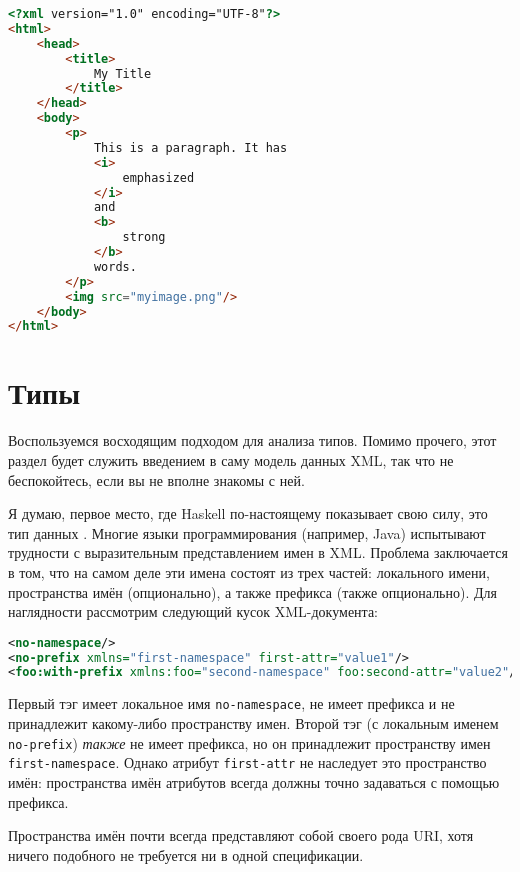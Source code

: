 

\begin{lstlisting}[language=HTML, caption={Выходные данные в формате XHTML}]
<?xml version="1.0" encoding="UTF-8"?>
<html>
    <head>
        <title>
            My Title
        </title>
    </head>
    <body>
        <p>
            This is a paragraph. It has 
            <i>
                emphasized
            </i>
            and 
            <b>
                strong
            </b>
            words.
        </p>
        <img src="myimage.png"/>
    </body>
</html>
\end{lstlisting}

\section{Типы} %

Воспользуемся восходящим подходом для анализа типов. Помимо прочего, этот раздел будет служить введением в саму модель данных XML, так что не беспокойтесь, если вы не вполне знакомы с ней.

Я думаю, первое место, где Haskell по-настоящему показывает свою силу, это тип данных . Многие языки программирования (например, Java) испытывают трудности с выразительным представлением имен в XML. Проблема заключается в том, что на самом деле эти имена состоят из трех частей: локального имени, пространства имён (опционально), а также префикса (также опционально). Для наглядности рассмотрим следующий кусок XML-документа:

\begin{lstlisting}[language=XML]
<no-namespace/>
<no-prefix xmlns="first-namespace" first-attr="value1"/>
<foo:with-prefix xmlns:foo="second-namespace" foo:second-attr="value2"/>
\end{lstlisting}

Первый тэг имеет локальное имя \lstinline!no-namespace!, не имеет префикса и не принадлежит какому-либо пространству имен. Второй тэг (с локальным именем \lstinline!no-prefix!) \emph{также} не имеет префикса, но он принадлежит пространству имен \lstinline!first-namespace!. Однако атрибут \lstinline!first-attr! не наследует это пространство имён: пространства имён атрибутов всегда должны точно задаваться с помощью префикса.

\begin{remark}
Пространства имён почти всегда представляют собой своего рода URI, хотя ничего подобного не требуется ни в одной спецификации.
\end{remark}

